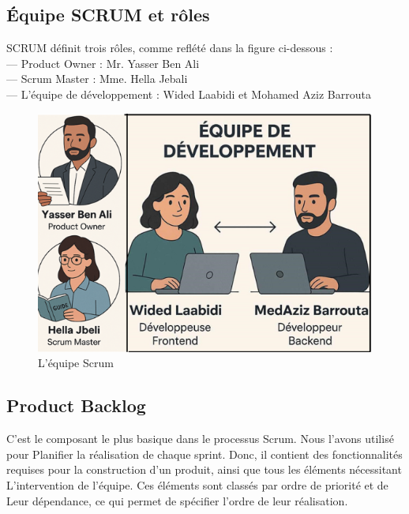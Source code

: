 \subsection{Équipe SCRUM et rôles}
SCRUM définit trois rôles, comme reflété dans la figure ci-dessous :\\
— Product Owner : Mr. Yasser Ben Ali\\
— Scrum Master : Mme. Hella Jebali\\
— L’équipe de développement : Wided Laabidi et Mohamed Aziz Barrouta

\begin{figure}[H]
    \centering
    \includegraphics[width=0.7\linewidth]{projet/images/diagramme de sequance/images/equipeScrum.png}
    \caption{L'équipe Scrum}
    \label{fig:equipe_scrum}
\end{figure}

\subsection{Product Backlog}
C'est le composant le plus basique dans le processus Scrum. Nous l’avons utilisé pour
Planifier la réalisation de chaque sprint. Donc, il contient des fonctionnalités
requises pour la construction d’un produit, ainsi que tous les éléments nécessitant
L’intervention de l’équipe. Ces éléments sont classés par ordre de priorité et de
Leur dépendance, ce qui permet de spécifier l’ordre de leur réalisation.\\

